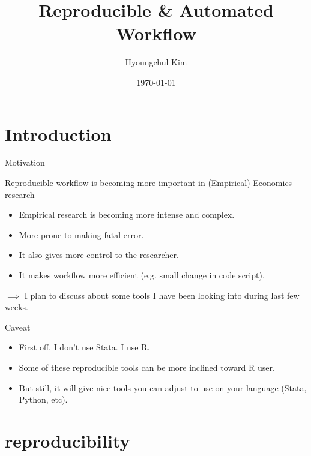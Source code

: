 \documentclass[10pt]{beamer}
\title{Reproducible \& Automated Workflow}
\author{Hyoungchul Kim}
\date{\today}
\institute{The Wharton School, University of Pennsylvania}
\begin{document}
\begin{frame}
\titlepage
\end{frame}


\section{Introduction}
\begin{frame}{Motivation}

Reproducible workflow is becoming more important in (Empirical) Economics research
\begin{itemize}
	\item Empirical research is becoming more intense and complex.
	\item More prone to making fatal error.
	\item It also gives more control to the researcher.
	\item It makes workflow more efficient (e.g. small change in code script).
\end{itemize}\vspace{5mm}

$\implies$ I plan to discuss about some tools I have been looking into during last few weeks.

\end{frame}

\begin{frame}{Caveat}
\begin{itemize}
	\item First off, I don't use Stata. I use R.
	\item Some of these reproducible tools can be more inclined toward R user.
	\item But still, it will give nice tools you can adjust to use on your language (Stata, Python, etc).
\end{itemize}	
\end{frame}
\section{reproducibility}
\end{document}
